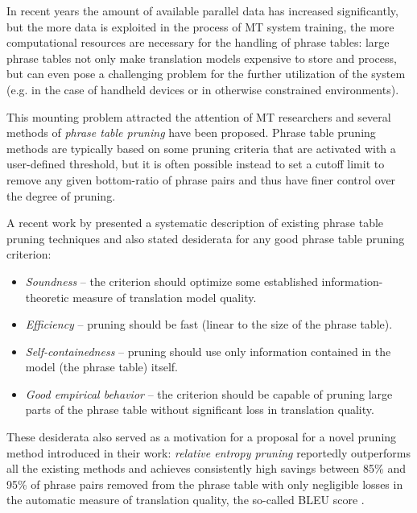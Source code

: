 In recent years the amount of available parallel data has increased significantly,
but the more data is exploited in the process of MT system training,
the more computational resources are necessary for the handling of phrase tables:
large phrase tables not only make translation models expensive to store and process,
but can even pose a challenging problem for the further utilization of the system
(e.g. in the case of handheld devices or in otherwise constrained environments).

This mounting problem attracted the attention of MT researchers and several methods
of \emph{phrase table pruning} have been proposed.
Phrase table pruning methods are typically based on some pruning criteria
that are activated with a user-defined threshold, but it is often possible instead to
set a cutoff limit to remove any given bottom-ratio of phrase pairs and thus have finer
control over the degree of pruning.

A recent work by \citet{zens:systcomp} presented a systematic description of existing
phrase table pruning techniques and also stated desiderata for any good phrase table pruning
criterion:
\begin{itemize}
  \item \emph{Soundness} -- the criterion should optimize some established
    information-theoretic measure of translation model quality.
  \item \emph{Efficiency} -- pruning should be fast (linear to the size of the phrase table).
  \item \emph{Self-containedness} -- pruning should use only information contained in the model
  (the phrase table) itself.
  \item \emph{Good empirical behavior} -- the criterion should be capable of pruning large parts
    of the phrase table without significant loss in translation quality.
\end{itemize}

These desiderata also served as a motivation for a proposal for a novel pruning method introduced
in their work: \emph{relative entropy pruning} reportedly outperforms all the existing methods and
achieves consistently high savings between 85\% and 95\% of phrase pairs removed from the phrase
table with only negligible losses in the automatic measure of translation quality, the so-called
BLEU score \citep{papineni:bleu}.

